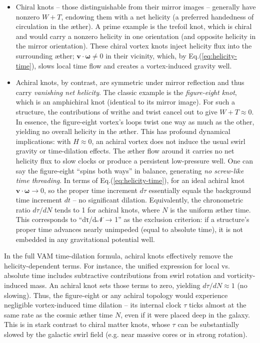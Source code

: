 \begin{itemize}

\item
Chiral knots – those distinguishable from their mirror images – generally have nonzero $W+T$, endowing them with a net helicity (a preferred handedness of circulation in the æther). A prime example is the trefoil knot, which is chiral and would carry a nonzero helicity in one orientation (and opposite helicity in the mirror orientation). These chiral vortex knots inject helicity flux into the surrounding æther; $\mathbf{v}\cdot\boldsymbol{\omega}\neq 0$ in their vicinity, which, by Eq.(\ref{eq:helicity-time}), slows local time flow and creates a vortex-induced gravity well.




\item
Achiral knots, by contrast, are symmetric under mirror reflection and thus carry \textit{vanishing net helicity}. The classic example is the \textit{figure-eight knot}, which is an amphichiral knot (identical to its mirror image). For such a structure, the contributions of writhe and twist cancel out to give $W+T \approx 0$. In essence, the figure-eight vortex’s loops twist one way as much as the other, yielding no overall helicity in the æther. This has profound dynamical implications: with $H \approx 0$, an achiral vortex does not induce the usual swirl gravity or time-dilation effects. The æther flow around it carries no net helicity flux to slow clocks or produce a persistent low-pressure well. One can say the figure-eight “spins both ways” in balance, generating \textit{no screw-like time threading}. In terms of Eq.(\ref{eq:helicity-time}), for an ideal achiral knot $\mathbf{v}\cdot\boldsymbol{\omega}\to 0$, so the proper time increment $d\tau$ essentially equals the background time increment $dt$ – no significant dilation. Equivalently, the chronometric ratio $d\tau/dN$ tends to 1 for achiral knots, where $N$ is the uniform æther time. This corresponds to “dτ/d𝒩 → 1” as the exclusion criterion: if a structure’s proper time advances nearly unimpeded (equal to absolute time), it is not embedded in any gravitational potential well.




\end{itemize}

In the full VAM time-dilation formula, achiral knots effectively remove the helicity-dependent terms. For instance, the unified expression for local vs. absolute time includes subtractive contributions from swirl rotation and vorticity-induced mass. An achiral knot sets those terms to zero, yielding $d\tau/dN \approx 1$ (no slowing). Thus, the figure-eight or any achiral topology would experience negligible vortex-induced time dilation – its internal clock $\tau$ ticks almost at the same rate as the cosmic æther time $N$, even if it were placed deep in the galaxy. This is in stark contrast to chiral matter knots, whose $\tau$ can be substantially slowed by the galactic swirl field (e.g. near massive cores or in strong rotation).


